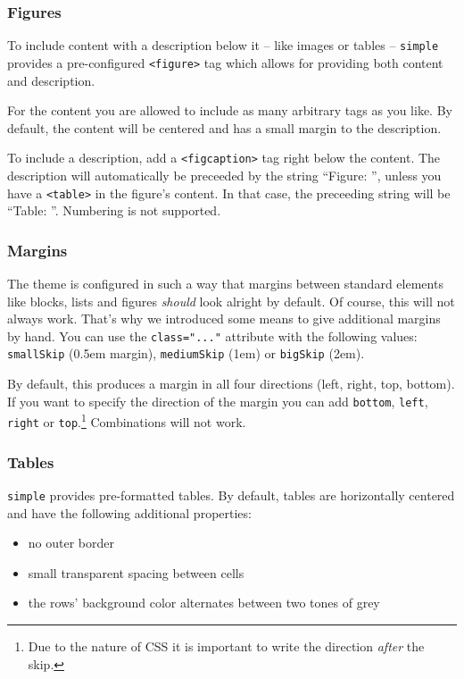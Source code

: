 \documentclass{scrartcl}
\newcommand{\code}[1]{{\tt #1}}
\newcommand{\tag}[1]{\code{<#1>}}
\begin{document}
\begin{appendix}
\subsubsection{Figures}
\label{subsubsection:figures}

To include content with a description below it -- like images or tables -- \code{simple} provides a pre-configured \tag{figure} tag which allows for providing both content and description.

For the content you are allowed to include as many arbitrary tags as you like. By default, the content will be centered and has a small margin to the description.

To include a description, add a \tag{figcaption} tag right below the content. The description will automatically be preceeded by the string ``Figure: '', unless you have a \tag{table} in the figure's content. In that case, the preceeding string will be ``Table: ''. Numbering is not supported.

\subsubsection{Margins}
\label{subsubsection:margins}

The theme is configured in such a way that margins between standard elements like blocks, lists and figures  \emph{should} look alright by default. Of course, this will not always work. That's why we introduced some means to give additional margins by hand. You can use the \code{class="..."} attribute with the following values: \code{smallSkip} (0.5em margin), \code{mediumSkip} (1em) or \code{bigSkip} (2em).

By default, this produces a margin in all four directions (left, right, top, bottom). If you want to specify the direction of the margin you can add \code{bottom}, \code{left}, \code{right} or \code{top}.\footnote{Due to the nature of CSS it is important to write the direction \emph{after} the skip.} Combinations will not work.

\subsubsection{Tables}
\label{subsubsection:tables}

\code{simple} provides pre-formatted tables. By default, tables are horizontally centered and have the following additional properties:
\begin{itemize}
\item no outer border
\item small transparent spacing between cells
\item the rows' background color alternates between two tones of grey
\end{itemize}



\end{appendix}
\end{document}
